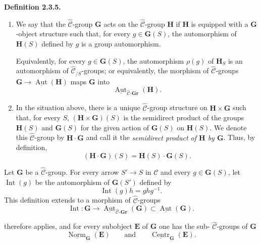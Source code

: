\medskip
\noindent{}\textbf{Definition 2.3.5.}
\begin{enumerate}
  \item[(a)]
  We say that the \(\widehat{\mathscr C}\)-group \(\mathbf G\) acts on
  the \(\widehat{\mathscr C}\)-group \(\mathbf H\) if \(\mathbf H\)
  is equipped with a \(\mathbf G\)-object structure such that, for
  every \(g\in\mathbf G(S)\), the automorphism of \(\mathbf H(S)\)
  defined by \(g\) is a group automorphism.

  Equivalently, for every \(g\in\mathbf G(S)\), the automorphism
  \(\rho(g)\) of \(\mathbf H_S\) is an automorphism of
  \(\widehat{\mathscr C}_{/S}\)-groups; or equivalently, the morphism of
  \(\widehat{\mathscr C}\)-groups
  \(\mathbf G\to\underline{\operatorname{Aut}}(\mathbf H)\) maps
  \(\mathbf G\) into
  \[
    \underline{\operatorname{Aut}}_{
      \widehat{\mathscr C}\text{-}\mathbf{Gr}}(\mathbf H).
  \]

  \item[(b)]
  In the situation above, there is a unique
  \(\widehat{\mathscr C}\)-group structure on
  \(\mathbf H\times\mathbf G\) such that, for every \(S\),
  \((\mathbf H\times\mathbf G)(S)\) is the semidirect product of the
  groups \(\mathbf H(S)\) and \(\mathbf G(S)\) for the given action of
  \(\mathbf G(S)\) on \(\mathbf H(S)\). We denote this
  \(\widehat{\mathscr C}\)-group by \(\mathbf H\mathbin{\cdot}\mathbf G\)
  and call it the \emph{semidirect product of \(\mathbf H\) by
  \(\mathbf G\)}. Thus, by definition,
  \[
    (\mathbf H\mathbin{\cdot}\mathbf G)(S)
      =\mathbf H(S)\mathbin{\cdot}\mathbf G(S).
  \]
\end{enumerate}

Let \(\mathbf G\) be a \(\widehat{\mathscr C}\)-group. For every arrow
\(S'\to S\) in \(\mathscr C\) and every \(g\in\mathbf G(S)\), let
\(\operatorname{Int}(g)\) be the automorphism of \(\mathbf G(S')\)
defined by
\[
  \operatorname{Int}(g)h=ghg^{-1}.
\]
This definition extends to a morphism of
\(\widehat{\mathscr C}\)-groups
\[
  \operatorname{Int}:\mathbf G\longrightarrow
  \underline{\operatorname{Aut}}_{
    \widehat{\mathscr C}\text{-}\mathbf{Gr}}(\mathbf G)
  \subset
  \underline{\operatorname{Aut}}(\mathbf G).
\]

 therefore applies, and for every subobject
\(\mathbf E\) of \(\mathbf G\) one has the sub-
\(\widehat{\mathscr C}\)-groups of \(\mathbf G\)
\[
  \underline{\operatorname{Norm}}_{\mathbf G}(\mathbf E)
  \qquad\text{and}\qquad
  \underline{\operatorname{Centr}}_{\mathbf G}(\mathbf E).
\]

